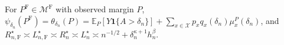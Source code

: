 For \(P^{\mathrm F}\in\mathcal M^{\mathrm F}\) with observed margin \(P\), \(\psi_{\delta_n}(P^{\mathrm F})=\theta_{\delta_n}(P)=\mathbb E_P[Y\mathbf 1\{A>\delta_n\}]+\sum_{x\in\mathcal X}p_xq_x(\delta_n)\mu_x^P(\delta_n)\), and \(R_{n,\mathrm F}^\star\asymp L_{n,\mathrm F}^\star\asymp R_n^\star\asymp L_n^\star\asymp n^{-1/2}+\delta_n^{\kappa+1}h_n^\beta\).